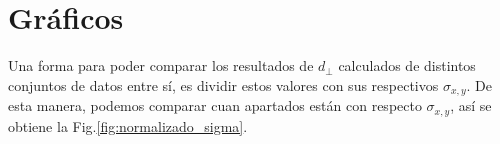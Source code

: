     \section{Gráficos}



    


    Una forma  para poder comparar los resultados de $d_\perp$ calculados de distintos conjuntos de  datos entre sí, es dividir estos valores con  sus respectivos $\sigma_{x,y}$. De esta manera, podemos comparar cuan apartados están con respecto $\sigma_{x,y}$, así se obtiene la Fig.\ref{fig:normalizado_sigma}.

